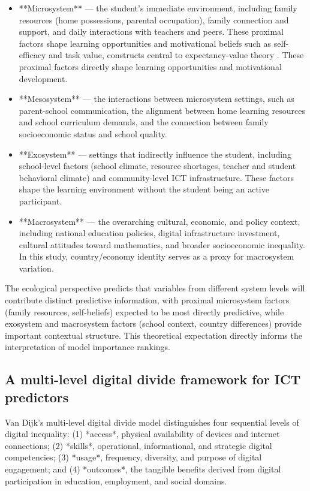 \documentclass[pdflatex,sn-mathphys-ay]{sn-jnl}
\begin{document}
\begin{itemize}
\item **Microsystem** — the student's immediate environment, including family resources (home possessions, parental occupation), family connection and support, and daily interactions with teachers and peers. These proximal factors shape learning opportunities and motivational beliefs such as self-efficacy and task value, constructs central to expectancy-value theory \citep{Eccles_Wigfield_2002}. These proximal factors directly shape learning opportunities and motivational development.
\item **Mesosystem** — the interactions between microsystem settings, such as parent-school communication, the alignment between home learning resources and school curriculum demands, and the connection between family socioeconomic status and school quality.
\item **Exosystem** — settings that indirectly influence the student, including school-level factors (school climate, resource shortages, teacher and student behavioral climate) and community-level ICT infrastructure. These factors shape the learning environment without the student being an active participant.
\item **Macrosystem** — the overarching cultural, economic, and policy context, including national education policies, digital infrastructure investment, cultural attitudes toward mathematics, and broader socioeconomic inequality. In this study, country/economy identity serves as a proxy for macrosystem variation.
\end{itemize}

The ecological perspective predicts that variables from different system levels will contribute distinct predictive information, with proximal microsystem factors (family resources, self-beliefs) expected to be most directly predictive, while exosystem and macrosystem factors (school context, country differences) provide important contextual structure. This theoretical expectation directly informs the interpretation of model importance rankings.

\FloatBarrier
\subsection{A multi-level digital divide framework for ICT predictors}

Van Dijk's multi-level digital divide model distinguishes four sequential levels of digital inequality: (1) *access*, physical availability of devices and internet connections; (2) *skills*, operational, informational, and strategic digital competencies; (3) *usage*, frequency, diversity, and purpose of digital engagement; and (4) *outcomes*, the tangible benefits derived from digital participation in education, employment, and social domains.
\end{document}
